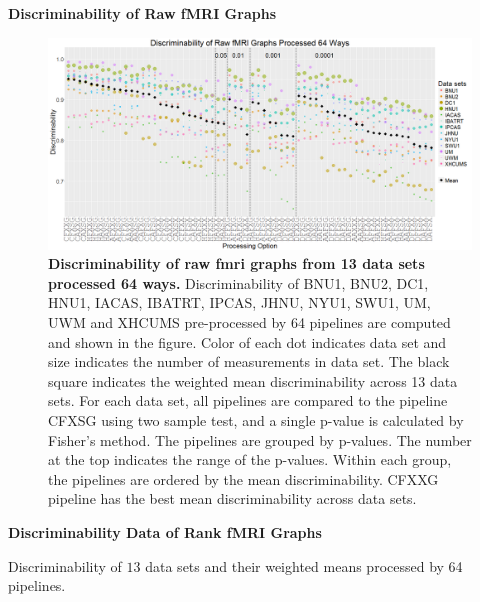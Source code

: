\documentclass{article}
\begin{document}
\noindent\bf{Discriminability of Raw fMRI Graphs}
\begin{figure}[H]
	\includegraphics[width=\linewidth]{../Figs/fmri_raw_pv.png}
	\caption{{\bf Discriminability of raw fmri graphs from 13 data sets processed 64 ways.}  Discriminability of BNU1, BNU2, DC1, HNU1, IACAS, IBATRT, IPCAS, JHNU, NYU1, SWU1, UM, UWM and XHCUMS pre-processed by 64 pipelines are computed and shown in the figure. Color of each dot indicates data set and size indicates the number of measurements in data set. The black square indicates the weighted mean discriminability across 13 data sets.  For each data set, all pipelines are compared to the pipeline CFXSG using two sample test, and a single p-value is calculated by Fisher's method. The pipelines are grouped by p-values. The number at the top indicates the range of the p-values. Within each group, the pipelines are ordered by the mean discriminability. CFXXG pipeline has the best mean discriminability across data sets.}
	\label{fig:raw}
\end{figure}

\noindent\bf{Discriminability Data of Rank fMRI Graphs}
\begin{table}

\caption{Discriminability of $13$ data sets and their weighted means processed by 64 pipelines. }
\end{table}
\end{document}
